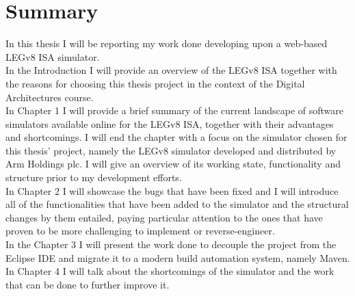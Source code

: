\chapter{Summary}

In this thesis I will be reporting my work done developing upon a web-based LEGv8 ISA simulator.
\\

In the Introduction I will provide an overview of the LEGv8 ISA together with the reasons for choosing this thesis project in the context of the Digital Architectures course.
\\

In Chapter 1 I will provide a brief summary of the current landscape of software simulators available online for the LEGv8 ISA, together with their advantages and shortcomings. I will end the chapter with a focus on the simulator chosen for this thesis' project, namely the LEGv8 simulator developed and distributed by Arm Holdings plc. I will give an overview of its working state, functionality and structure prior to my development efforts.
\\

In Chapter 2 I will showcase the bugs that have been fixed and I will introduce all of the functionalities that have been added to the simulator and the structural changes by them entailed, paying particular attention to the ones that have proven to be more challenging to implement or reverse-engineer.
\\

In the Chapter 3 I will present the work done to decouple the project from the Eclipse IDE and migrate it to a modern build automation system, namely Maven.
\\

In Chapter 4 I will talk about the shortcomings of the simulator and the work that can be done to further improve it.

